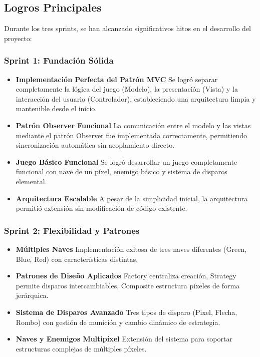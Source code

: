 \documentclass[12pt, a4paper]{article}
\begin{document}
\subsection{Logros Principales}

Durante los tres sprints, se han alcanzado significativos hitos en el desarrollo del proyecto:

\subsubsection{Sprint 1: Fundación Sólida}

\begin{itemize}[leftmargin=2em]
    \item \textbf{Implementación Perfecta del Patrón MVC}
        Se logró separar completamente la lógica del juego (Modelo), la presentación (Vista) y la interacción del usuario (Controlador), estableciendo una arquitectura limpia y mantenible desde el inicio.
    
    \item \textbf{Patrón Observer Funcional}
        La comunicación entre el modelo y las vistas mediante el patrón Observer fue implementada correctamente, permitiendo sincronización automática sin acoplamiento directo.
    
    \item \textbf{Juego Básico Funcional}
        Se logró desarrollar un juego completamente funcional con nave de un píxel, enemigo básico y sistema de disparos elemental.
    
    \item \textbf{Arquitectura Escalable}
        A pesar de la simplicidad inicial, la arquitectura permitió extensión sin modificación de código existente.
\end{itemize}

\subsubsection{Sprint 2: Flexibilidad y Patrones}

\begin{itemize}[leftmargin=2em]
    \item \textbf{Múltiples Naves}
        Implementación exitosa de tres naves diferentes (Green, Blue, Red) con características distintas.
    
    \item \textbf{Patrones de Diseño Aplicados}
        Factory centraliza creación, Strategy permite disparos intercambiables, Composite estructura píxeles de forma jerárquica.
    
    \item \textbf{Sistema de Disparos Avanzado}
        Tres tipos de disparo (Pixel, Flecha, Rombo) con gestión de munición y cambio dinámico de estrategia.
    
    \item \textbf{Naves y Enemigos Multipíxel}
        Extensión del sistema para soportar estructuras complejas de múltiples píxeles.
\end{itemize}
\end{document}
